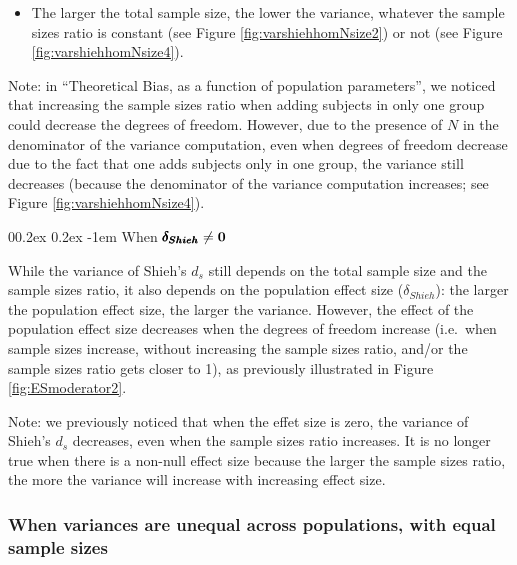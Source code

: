 \documentclass[
  english,
  man]{apa6}
\makeatletter
\providecommand{\tightlist}{%
  \setlength{\itemsep}{0pt}\setlength{\parskip}{0pt}}
\let\oldparagraph\paragraph
\renewcommand{\paragraph}[1]{\oldparagraph{#1}\mbox{}}
\renewcommand{\paragraph}{\@startsection{paragraph}{4}{\parindent}%
  {0\baselineskip \@plus 0.2ex \@minus 0.2ex}%
  {-1em}%
  {\normalfont\normalsize\bfseries\itshape\typesectitle}}
\makeatother
\begin{document}
\begin{itemize}
\tightlist
\item
  The larger the total sample size, the lower the variance, whatever the sample sizes ratio is constant (see Figure \ref{fig:varshiehhomNsize2}) or not (see Figure \ref{fig:varshiehhomNsize4}).
\end{itemize}

Note: in \enquote{Theoretical Bias, as a function of population parameters}, we noticed that increasing the sample sizes ratio when adding subjects in only one group could decrease the degrees of freedom. However, due to the presence of \(N\) in the denominator of the variance computation, even when degrees of freedom decrease due to the fact that one adds subjects only in one group, the variance still decreases (because the denominator of the variance computation increases; see Figure \ref{fig:varshiehhomNsize4}).

\hypertarget{when-bf-pmbdelta_shieh-neq-0}{%
\paragraph{\texorpdfstring{When \(\bf \pmb{\delta_{Shieh}} \neq 0\)}{When \textbackslash bf \textbackslash pmb\{\textbackslash delta\_\{Shieh\}\} \textbackslash neq 0}}\label{when-bf-pmbdelta_shieh-neq-0}}

While the variance of Shieh's \(d_s\) still depends on the total sample size and the sample sizes ratio, it also depends on the population effect size (\(\delta_{Shieh}\)): the larger the population effect size, the larger the variance. However, the effect of the population effect size decreases when the degrees of freedom increase (i.e.~when sample sizes increase, without increasing the sample sizes ratio, and/or the sample sizes ratio gets closer to 1), as previously illustrated in Figure \ref{fig:ESmoderator2}.

Note: we previously noticed that when the effet size is zero, the variance of Shieh's \(d_s\) decreases, even when the sample sizes ratio increases. It is no longer true when there is a non-null effect size because the larger the sample sizes ratio, the more the variance will increase with increasing effect size.

\hypertarget{when-variances-are-unequal-across-populations-with-equal-sample-sizes-2}{%
\subsubsection{When variances are unequal across populations, with equal sample sizes}\label{when-variances-are-unequal-across-populations-with-equal-sample-sizes-2}}
\end{document}
